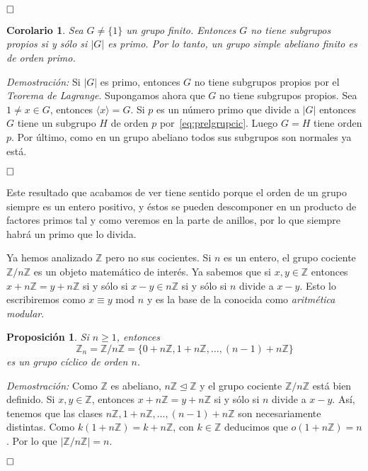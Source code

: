 \documentclass[12pt]{article}
\newtheorem{proposition}[theorem]{Proposición}
\newtheorem{corolario}{Corolario}[theorem]
\begin{document}
$\hfill \square$

\begin{corolario}\label{eq:abSimple} Sea $G \neq \lbrace 1 \rbrace$ un grupo finito. Entonces $G$ no tiene subgrupos propios si y sólo si $|G|$ es primo. Por lo tanto, un grupo simple abeliano finito es de orden primo.
\end{corolario}
\emph{Demostración: }Si $|G|$ es primo, entonces $G$ no tiene subgrupos propios por el \textit{Teorema de Lagrange}. Supongamos ahora que $G$ no tiene subgrupos propios. Sea $1 \neq x \in G$, entonces $\langle x \rangle = G$. Si $p$ es un número primo que divide a $|G|$ entonces $G$ tiene un subgrupo $H$ de orden $p$ por~\ref{eq:prelgrupcic}. Luego $G = H$ tiene orden $p$. Por último, como en un grupo abeliano todos sus subgrupos son normales ya está.

$\hfill \square$

Este resultado que acabamos de ver tiene sentido porque el orden de un grupo siempre es un entero positivo, y éstos se pueden descomponer en un producto de factores primos tal y como veremos en la parte de anillos, por lo que siempre habrá un primo que lo divida.



Ya hemos analizado $\mathbb{Z}$ pero no sus cocientes. Si $n$ es un entero, el grupo cociente $\mathbb{Z}/n\mathbb{Z}$ es un objeto matemático de interés. Ya sabemos que si $x,y \in \mathbb{Z}$ entonces $x+n\mathbb{Z} = y + n\mathbb{Z}$ si y sólo si $x-y \in n\mathbb{Z}$ si y sólo si $n$ divide a $x-y$. Esto lo escribiremos como $x \equiv y$ mod $n$ y es la base de la conocida como \textit{aritmética modular}.

\begin{proposition}Si $n \geq 1$, entonces $$\mathbb{Z}_n=\mathbb{Z}/n\mathbb{Z} = \lbrace 0+n\mathbb{Z}, 1+n\mathbb{Z}, \ldots, (n-1)+n\mathbb{Z} \rbrace$$ es un grupo cíclico de orden $n$.
\end{proposition}
\emph{Demostración: }Como $\mathbb{Z}$ es abeliano, $n\mathbb{Z} \unlhd \mathbb{Z}$ y el grupo cociente $\mathbb{Z}/n\mathbb{Z}$ está bien definido. Si $x,y \in \mathbb{Z}$, entonces $x +n\mathbb{Z} = y + n\mathbb{Z}$ si y sólo si $n$ divide a $x-y$. Así, tenemos que las clases $n\mathbb{Z}, 1+n\mathbb{Z}, \ldots, (n-1) +n\mathbb{Z}$ son necesariamente distintas. Como $k(1+n\mathbb{Z}) = k + n\mathbb{Z}$, con $k \in \mathbb{Z}$ deducimos que $o(1+n\mathbb{Z})=n$. Por lo que $|\mathbb{Z}/n\mathbb{Z}| = n$.

$\hfill \square$
\end{document}
